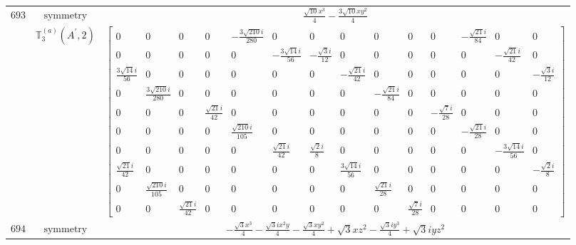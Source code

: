 \documentclass[fleqn,8pt,landscape]{jsarticle}
\begin{document}
\begin{longtable}{ccc}
$ 693 $ & $ \text{symmetry} $ & $ \frac{\sqrt{10} x^{3}}{4} - \frac{3 \sqrt{10} x y^{2}}{4} $ \\
$  $ & $ \mathbb{T}_{3}^{(a)}(A^{\prime},2) $ & $ \begin{bmatrix} 0 & 0 & 0 & 0 & - \frac{3 \sqrt{210} i}{280} & 0 & 0 & 0 & 0 & 0 & 0 & - \frac{\sqrt{21} i}{84} & 0 & 0 \\ 0 & 0 & 0 & 0 & 0 & - \frac{3 \sqrt{14} i}{56} & - \frac{\sqrt{3} i}{12} & 0 & 0 & 0 & 0 & 0 & - \frac{\sqrt{21} i}{42} & 0 \\ \frac{3 \sqrt{14} i}{56} & 0 & 0 & 0 & 0 & 0 & 0 & - \frac{\sqrt{21} i}{42} & 0 & 0 & 0 & 0 & 0 & - \frac{\sqrt{3} i}{12} \\ 0 & \frac{3 \sqrt{210} i}{280} & 0 & 0 & 0 & 0 & 0 & 0 & - \frac{\sqrt{21} i}{84} & 0 & 0 & 0 & 0 & 0 \\ 0 & 0 & 0 & \frac{\sqrt{21} i}{42} & 0 & 0 & 0 & 0 & 0 & 0 & - \frac{\sqrt{7} i}{28} & 0 & 0 & 0 \\ 0 & 0 & 0 & 0 & \frac{\sqrt{210} i}{105} & 0 & 0 & 0 & 0 & 0 & 0 & - \frac{\sqrt{21} i}{28} & 0 & 0 \\ 0 & 0 & 0 & 0 & 0 & \frac{\sqrt{21} i}{42} & \frac{\sqrt{2} i}{8} & 0 & 0 & 0 & 0 & 0 & - \frac{3 \sqrt{14} i}{56} & 0 \\ \frac{\sqrt{21} i}{42} & 0 & 0 & 0 & 0 & 0 & 0 & \frac{3 \sqrt{14} i}{56} & 0 & 0 & 0 & 0 & 0 & - \frac{\sqrt{2} i}{8} \\ 0 & \frac{\sqrt{210} i}{105} & 0 & 0 & 0 & 0 & 0 & 0 & \frac{\sqrt{21} i}{28} & 0 & 0 & 0 & 0 & 0 \\ 0 & 0 & \frac{\sqrt{21} i}{42} & 0 & 0 & 0 & 0 & 0 & 0 & \frac{\sqrt{7} i}{28} & 0 & 0 & 0 & 0 \end{bmatrix} $ \\ \hline
$ 694 $ & $ \text{symmetry} $ & $ - \frac{\sqrt{3} x^{3}}{4} - \frac{\sqrt{3} i x^{2} y}{4} - \frac{\sqrt{3} x y^{2}}{4} + \sqrt{3} x z^{2} - \frac{\sqrt{3} i y^{3}}{4} + \sqrt{3} i y z^{2} $ \\

\end{longtable}
\end{document}
